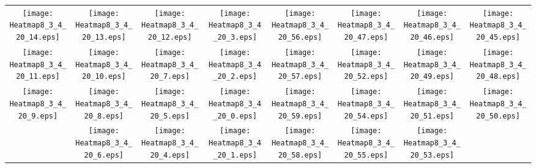 \documentclass{standalone}
\begin{document}
\begin{tabular}{ *8{c} }
\texttt{[image: Heatmap8\_3\_4\_20\_14.eps]} & \texttt{[image: Heatmap8\_3\_4\_20\_13.eps]} & \texttt{[image: Heatmap8\_3\_4\_20\_12.eps]} & \texttt{[image: Heatmap8\_3\_4\_20\_3.eps]} & \texttt{[image: Heatmap8\_3\_4\_20\_56.eps]} & \texttt{[image: Heatmap8\_3\_4\_20\_47.eps]} & \texttt{[image: Heatmap8\_3\_4\_20\_46.eps]} & \texttt{[image: Heatmap8\_3\_4\_20\_45.eps]} \\
\texttt{[image: Heatmap8\_3\_4\_20\_11.eps]} & \texttt{[image: Heatmap8\_3\_4\_20\_10.eps]} & \texttt{[image: Heatmap8\_3\_4\_20\_7.eps]} & \texttt{[image: Heatmap8\_3\_4\_20\_2.eps]} & \texttt{[image: Heatmap8\_3\_4\_20\_57.eps]} & \texttt{[image: Heatmap8\_3\_4\_20\_52.eps]} & \texttt{[image: Heatmap8\_3\_4\_20\_49.eps]} & \texttt{[image: Heatmap8\_3\_4\_20\_48.eps]} \\
\texttt{[image: Heatmap8\_3\_4\_20\_9.eps]} & \texttt{[image: Heatmap8\_3\_4\_20\_8.eps]} & \texttt{[image: Heatmap8\_3\_4\_20\_5.eps]} & \texttt{[image: Heatmap8\_3\_4\_20\_0.eps]} & \texttt{[image: Heatmap8\_3\_4\_20\_59.eps]} & \texttt{[image: Heatmap8\_3\_4\_20\_54.eps]} & \texttt{[image: Heatmap8\_3\_4\_20\_51.eps]} & \texttt{[image: Heatmap8\_3\_4\_20\_50.eps]} \\
 & \texttt{[image: Heatmap8\_3\_4\_20\_6.eps]} & \texttt{[image: Heatmap8\_3\_4\_20\_4.eps]} & \texttt{[image: Heatmap8\_3\_4\_20\_1.eps]} & \texttt{[image: Heatmap8\_3\_4\_20\_58.eps]} & \texttt{[image: Heatmap8\_3\_4\_20\_55.eps]} & \texttt{[image: Heatmap8\_3\_4\_20\_53.eps]} &  
\end{tabular}
\end{document}
